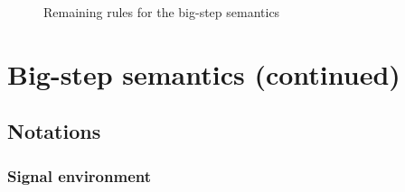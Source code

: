 \documentclass[9pt,preprint]{sigplanconf}
\begin{document}


\appendix

%

\begin{figure*}[t]


\caption{Remaining rules for the big-step semantics}
\label{fig:big_step_other}
\end{figure*}


\section{Big-step semantics (continued)}
\label{sec:big_step_other}

\subsection{Notations}

\subsubsection*{Signal environment}
\end{document}
